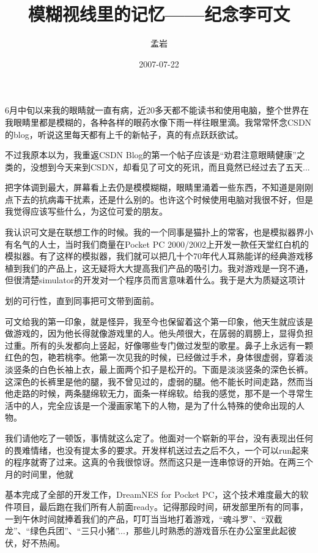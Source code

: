\documentclass{article}
\title{模糊视线里的记忆——纪念李可文}
\author{孟岩}
\date{2007-07-22}
\begin{document}

\maketitle


\Large

﻿6月中旬以来我的眼睛就一直有病，近20多天都不能读书和使用电脑，整个世界在我眼睛里都是模糊的，各种各样的眼药水像下雨一样往眼里滴。我常常怀念CSDN的blog，听说这里每天都有上千的新帖子，真的有点跃跃欲试。

不过我原本以为，我重返CSDN Blog的第一个帖子应该是“劝君注意眼睛健康”之类的，没想到今天来到CSDN，却看见了可文的死讯，而且竟然已经过去了五天...

把字体调到最大，屏幕看上去仍是模模糊糊，眼睛里涌着一些东西，不知道是刚刚点下去的抗病毒干扰素，还是什么别的。也许这个时候使用电脑对我很不好，但是我觉得应该写些什么，为这位可爱的朋友。

我认识可文是在联想工作的时候。我的一个同事是猫扑上的常客，也是模拟器界小有名气的人士，当时我们商量在Pocket PC 2000/2002上开发一款任天堂红白机的模拟器。有了这样的模拟器，我们就可以把几十个70年代人耳熟能详的经典游戏移植到我们的产品上，这无疑将大大提高我们产品的吸引力。我对游戏是一窍不通，但很清楚simulator的开发对一个程序员而言意味着什么。我于是大为质疑这项计

\newpage 

划的可行性，直到同事把可文带到面前。

可文给我的第一印象，就是怪异，我至今也保留着这个第一印象，他天生就应该是做游戏的，因为他长得就像游戏里的人。他头颅很大，在孱弱的肩膀上，显得负担过重。所有的头发都向上竖起，好像哪些专门做过发型的歌星。鼻子上永远有一颗红色的包，艳若桃李。他第一次见我的时候，已经做过手术，身体很虚弱，穿着淡淡竖条的白色长袖上衣，最上面两个扣子是松开的。下面是淡淡竖条的深色长裤。这深色的长裤里是他的腿，我不曾见过的，虚弱的腿。他不能长时间走路，然而当他走路的时候，两条腿绵软无力，面条一样绵软。给我的感觉，那不是一个寻常生活中的人，完全应该是一个漫画家笔下的人物，是为了什么特殊的使命出现的人物。

我们请他吃了一顿饭，事情就这么定了。他面对一个崭新的平台，没有表现出任何的畏难情绪，也没有提太多的要求。开发样机送过去之后不久，一个可以run起来的程序就寄了过来。这真的令我很惊讶。然而这只是一连串惊讶的开始。在两三个月的时间里，他就

\newpage 

基本完成了全部的开发工作，DreamNES for Pocket PC，这个技术难度最大的软件项目，最后跑在我们所有人前面ready。记得那段时间，研发部里所有的同事，一到午休时间就捧着我们的产品，叮叮当当地打着游戏，“魂斗罗”、“双截龙”、“绿色兵团”、“三只小猪”...，那些儿时熟悉的游戏音乐在办公室里此起彼伏，好不热闹。
\end{document}

